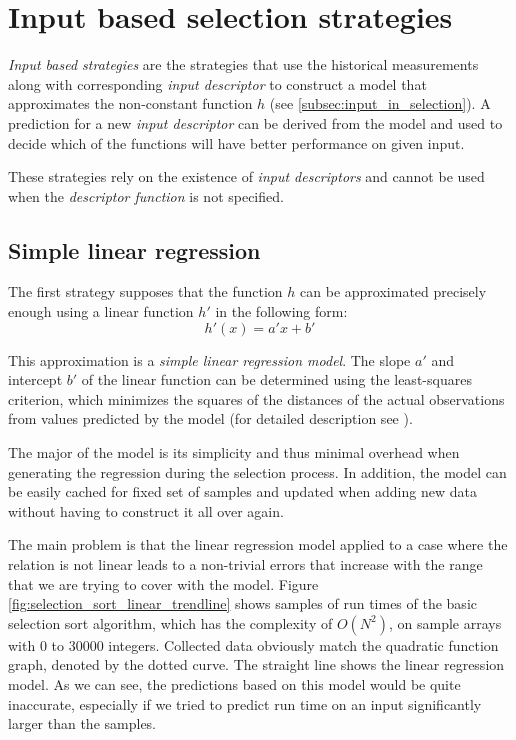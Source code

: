 \section{Input based selection strategies}
\label{sec:input_based_strategies}

\textit{Input based strategies} are the strategies that use the historical measurements along with corresponding \textit{input descriptor} to construct a model that approximates the non-constant function $h$ (see \ref{subsec:input_in_selection}). A prediction for a new \textit{input descriptor} can be derived from the model and used to decide which of the functions will have better performance on given input.

These strategies rely on the existence of \textit{input descriptors} and cannot be used when the \textit{descriptor function} is not specified.

\subsection{Simple linear regression}
\label{subsec:simple_linear_regression}

The first strategy supposes that the function \(h\) can be approximated precisely enough using a linear function \(h'\) in the following form:
\[h'(x) = a' x + b'\]

This approximation is a \textit{simple linear regression model}. The slope \(a'\) and intercept \(b'\) of the linear function can be determined using the least-squares criterion, which minimizes the squares of the distances of the actual observations from values predicted by the model (for detailed description see \cite{weiss_introductory_2010}).

The major of the model is its simplicity and thus minimal overhead when generating the regression during the selection process. In addition, the model can be easily cached for fixed set of samples and updated when adding new data without having to construct it all over again.

The main problem is that the linear regression model applied to a case where the relation is not linear leads to a non-trivial errors that increase with the range that we are trying to cover with the model. Figure \ref{fig:selection_sort_linear_trendline} shows samples of run times of the basic selection sort algorithm, which has the complexity of \(O(N^2)\), on sample arrays with 0 to 30000 integers. Collected data obviously match the quadratic function graph, denoted by the dotted curve. The straight line shows the linear regression model. As we can see, the predictions based on this model would be quite inaccurate, especially if we tried to predict run time on an input significantly larger than the samples.


